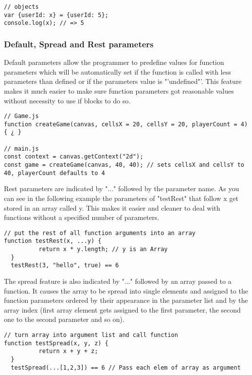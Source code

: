 \documentclass{bioinfo}
\begin{document}
\begin{lstlisting}[caption= My Javascript Example]
// objects
var {userId: x} = {userId: 5};
console.log(x); // => 5
\end{lstlisting}

\subsubsection{Default, Spread and Rest parameters}
Default parameters allow the programmer to predefine values for function parameters which will be automatically
set if the function is called with less parameters than defined or if the parameters value is "'undefined"'.
This feature makes it much easier to make sure function parameters got reasonable values without necessity to
use if blocks to do so.

\begin{lstlisting}[caption= My Javascript Example]
// Game.js
function createGame(canvas, cellsX = 20, cellsY = 20, playerCount = 4) { ¿ }

// main.js
const context = canvas.getContext("2d");
const game = createGame(canvas, 40, 40); // sets cellsX and cellsY to 40, playerCount defaults to 4
\end{lstlisting}

Rest parameters are indicated by  "..." followed by the parameter name. As you can see in the following 
example the parameters of "testRest" that follow x get stored in an array called y. This makes it easier
and cleaner to deal with functions without a specified number of parameters.

\begin{lstlisting}[caption= My Javascript Example]
// put the rest of all function arguments into an array
function testRest(x, ...y) {
          return x * y.length; // y is an Array
  }
  testRest(3, "hello", true) == 6
\end{lstlisting}

The spread feature is also indicated by "..." followed by an array passed to a function. It causes the array to be spread into single
elements and assigned to the function parameters ordered by their appearance in the parameter list and by the array index (first array element gets assigned to the first parameter, the second one to the second parameter and so on).
\begin{lstlisting}[caption= My Javascript Example]
// turn array into argument list and call function
function testSpread(x, y, z) {
          return x + y + z;
  }
  testSpread(...[1,2,3]) == 6 // Pass each elem of array as argument
\end{lstlisting}
\end{document}
